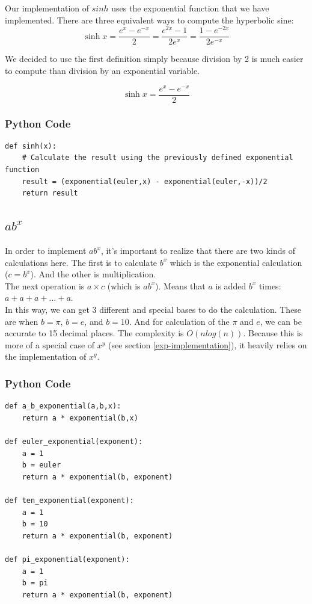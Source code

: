 \documentclass[11pt,onside]{report}
\begin{document}
Our implementation of $sinh$ uses the exponential function that we have implemented. There are three equivalent ways to compute the hyperbolic sine:
\begin{equation}
    \sinh{x} = \frac{e^x - e^{-x}}{2} = \frac{e^{2x} - 1}{2e^x} = \frac{1-e^{-2x}}{2e^{-x}}
\end{equation}

We decided to use the first definition simply because division by 2 is much easier to compute than division by an exponential variable.

\begin{equation}
    \sinh{x} = \frac{e^x - e^{-x}}{2}
\end{equation}
\subsubsection{Python Code}
\begin{lstlisting}
def sinh(x):
    # Calculate the result using the previously defined exponential function
    result = (exponential(euler,x) - exponential(euler,-x))/2
    return result
\end{lstlisting}

\subsection{$ab^x$}
In order to implement $ab^x$, it's important to realize that there are two kinds of calculations here. The first is to calculate $b^x$ which is the exponential calculation ($c=b^x$). And the other is multiplication. \\

The next operation is $a \times c$ (which is $ab^x$). Means that $a$ is added $b^x$ times: $a + a + a + \ldots + a$. \\

In this way, we can get 3 different and special bases to do the calculation. These are when $b = \pi$, $b = e$, and $b = 10$. And for calculation of the $\pi$ and $e$, we can be accurate to 15 decimal places. The complexity is $O(nlog(n))$. Because this is more of a special case of $x^y$ (see section \ref{exp-implementation}), it heavily relies on the implementation of $x^y$.

\subsubsection{Python Code}
\begin{lstlisting}
def a_b_exponential(a,b,x):
    return a * exponential(b,x)
    
def euler_exponential(exponent):
    a = 1
    b = euler
    return a * exponential(b, exponent)

def ten_exponential(exponent):
    a = 1
    b = 10
    return a * exponential(b, exponent)

def pi_exponential(exponent):
    a = 1
    b = pi
    return a * exponential(b, exponent)
\end{lstlisting}
\end{document}
